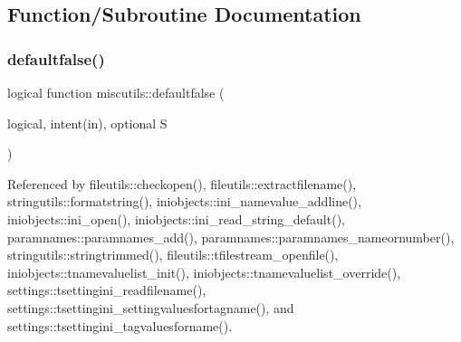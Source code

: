 \subsection{Function/\+Subroutine Documentation}
\mbox{\label{namespacemiscutils_a9337630be33970a7cde8995bd73c58da}} 
\subsubsection{\texorpdfstring{defaultfalse()}{defaultfalse()}}
{\footnotesize\ttfamily logical function miscutils\+::defaultfalse (\begin{DoxyParamCaption}\item[{logical, intent(in), optional}]{S }\end{DoxyParamCaption})}



Referenced by fileutils\+::checkopen(), fileutils\+::extractfilename(), stringutils\+::formatstring(), iniobjects\+::ini\+\_\+namevalue\+\_\+addline(), iniobjects\+::ini\+\_\+open(), iniobjects\+::ini\+\_\+read\+\_\+string\+\_\+default(), paramnames\+::paramnames\+\_\+add(), paramnames\+::paramnames\+\_\+nameornumber(), stringutils\+::stringtrimmed(), fileutils\+::tfilestream\+\_\+openfile(), iniobjects\+::tnamevaluelist\+\_\+init(), iniobjects\+::tnamevaluelist\+\_\+override(), settings\+::tsettingini\+\_\+readfilename(), settings\+::tsettingini\+\_\+settingvaluesfortagname(), and settings\+::tsettingini\+\_\+tagvaluesforname().


